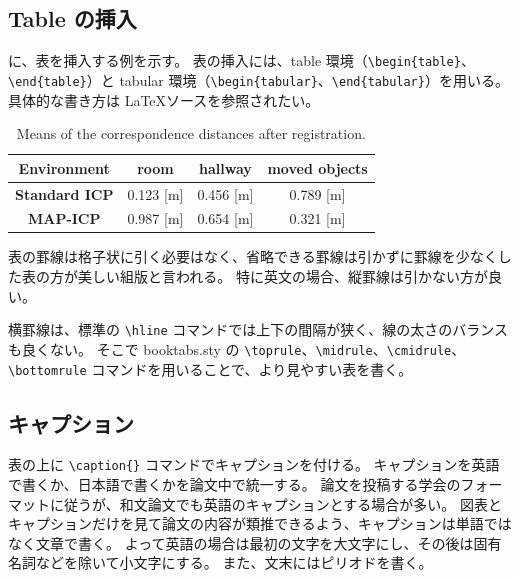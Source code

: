 \documentclass[uplatex, twocolumn, 9pt]{jsproceedings}
\begin{document}
\subsection{Table の挿入}
に、表を挿入する例を示す。
表の挿入には、table 環境（\verb*|\begin{table}|、\verb*|\end{table}|）と tabular 環境（\verb*|\begin{tabular}|、\verb*|\end{tabular}|）を用いる。
具体的な書き方は \LaTeX ソースを参照されたい。

\begin{table}
  \centering
  \caption{Means of the correspondence distances after registration.}
  \label{table:corr-dist}
  \begin{tabular}{cccc}
  \toprule%
  \textbf{Environment} & room & hallway & moved objects\\
  \midrule%
  \textbf{Standard ICP} & 0.123 [m] & 0.456 [m] & 0.789 [m]\\
  \textbf{MAP-ICP} & 0.987 [m] & 0.654 [m] & 0.321 [m]\\
  \bottomrule%
  \end{tabular}
\end{table}

表の罫線は格子状に引く必要はなく、省略できる罫線は引かずに罫線を少なくした表の方が美しい組版と言われる。
特に英文の場合、縦罫線は引かない方が良い。

横罫線は、標準の \verb*|\hline| コマンドでは上下の間隔が狭く、線の太さのバランスも良くない。
そこで booktabs.sty の \verb*|\toprule|、\verb*|\midrule|、\verb*|\cmidrule|、\verb*|\bottomrule| コマンドを用いることで、より見やすい表を書く。

\subsection{キャプション}
表の上に \verb*|\caption{}| コマンドでキャプションを付ける。
キャプションを英語で書くか、日本語で書くかを論文中で統一する。
論文を投稿する学会のフォーマットに従うが、和文論文でも英語のキャプションとする場合が多い。
図表とキャプションだけを見て論文の内容が類推できるよう、キャプションは単語ではなく文章で書く。
よって英語の場合は最初の文字を大文字にし、その後は固有名詞などを除いて小文字にする。
また、文末にはピリオドを書く。
\end{document}
